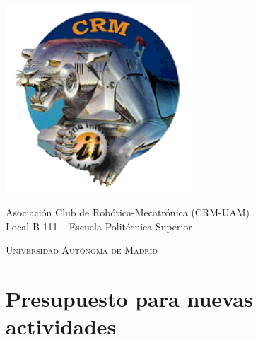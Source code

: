 \documentclass[12pt,twoside]{report}
\begin{document}
\begin{titlepage}
\includegraphics[width = 7cm]{fotos/logo_crm-192x192.png}

{\large Asociación Club de Robótica-Mecatrónica (CRM-UAM)} \\
Local B-111 -- Escuela Politécnica Superior

\vfill

\textsc{\Large Universidad Autónoma de Madrid}\\[0.5cm]

\vfill



\makeatletter
{ \Large \@date }
\vfill
\makeatother


\end{titlepage}

\clearpage{\pagestyle{empty}\cleardoublepage}


\setcounter{page}{1}
\pagestyle{fancy}






\begin{spacing}{0.1}
\tableofcontents
\end{spacing}

\clearpage{\pagestyle{empty}\cleardoublepage}

\setcounter{page}{1}

\fancyhead[LE,RO]{\slshape}
\fancyhead[LO,RE]{\slshape \leftmark}



\chapter{Presupuesto para nuevas actividades}
\end{document}
